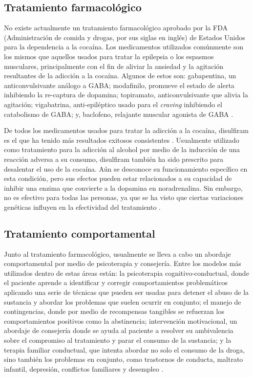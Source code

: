 \subsection{Tratamiento farmacológico}
No existe actualmente un tratamiento farmacológico aprobado por la FDA (Administración de comida y drogas, por sus siglas en inglés) de Estados Unidos para la dependencia a la cocaína.
Los medicamentos utilizados comúnmente son los mismos que aquellos usados para tratar la epilepsia o los espasmos musculares, principalmente con el fin de aliviar la ansiedad y la agitación resultantes de la adicción a la cocaína.
Algunos de estos son: gabapentina, un anticonvulsivante análogo a GABA; modafinilo, promueve el estado de alerta inhibiendo la re-captura de dopamina; topiramato, anticonvulsivante que alivia la agitación; vigabatrina, anti-epiléptico usado para el \textit{craving} inhibiendo el catabolismo de GABA; y, baclofeno, relajante muscular agonista de GABA \parencite{Volkow2007b}.\par
De todos los medicamentos usados para tratar la adicción a la cocaína, disulfiram es el que ha tenido más resultados exitosos consistentes \parencite{Volkow2007b}.
Usualmente utilizado como tratamiento para la adicción al alcohol por medio de la inducción de una reacción adversa a su consumo, disulfiram también ha sido prescrito para desalentar el uso de la cocaína.
Aún se desconoce su funcionamiento específico en esta condición, pero sus efectos pueden estar relacionados a su capacidad de inhibir una enzima que convierte a la dopamina en noradrenalina.
Sin embargo, no es efectivo para todas las personas, ya que se ha visto que ciertas variaciones genéticas influyen en la efectividad del tratamiento \parencite{Gaval-Cruz2009a, Volkow2007b}.

\subsection{Tratamiento comportamental}
Junto al tratamiento farmacológico, usualmente se lleva a cabo un abordaje comportamental por medio de psicoterapia y consejería.
Entre los modelos más utilizados dentro de estas áreas están:
la psicoterapia cognitivo-conductual, donde el paciente aprende a identificar y corregir comportamientos problemáticos aplicando una serie de técnicas que pueden ser usadas para detener el abuso de la sustancia y abordar los problemas que suelen ocurrir en conjunto;
el manejo de contingencias, donde por medio de recompensas tangibles se refuerzan los comportamientos positivos como la abstinencia;
intervención motivacional, un abordaje de consejería donde se ayuda al paciente a resolver su ambivalencia sobre el compromiso al tratamiento y parar el consumo de la sustancia;
y la terapia familiar conductual, que intenta abordar no solo el consumo de la droga, sino también los problemas en conjunto, como trastornos de conducta, maltrato infantil, depresión, conflictos familiares y desempleo \parencite{Volkow2008}.

